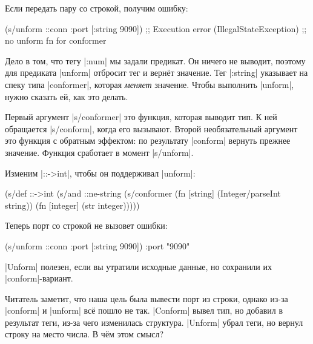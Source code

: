 \noindent
Если передать пару со строкой, получим ошибку:

\begin{english}
  \begin{clojure}
(s/unform ::conn {:port [:string 9090]})
;; Execution error (IllegalStateException)
;; no unform fn for conformer
  \end{clojure}
\end{english}

Дело в том, что тегу \spverb|:num| мы задали предикат. Он ничего не выводит,
поэтому для предиката \spverb|unform| отбросит тег и верн\"{е}т значение. Тег
\spverb|:string| указывает на спеку типа \spverb|conformer|, которая
\emph{меняет} значение. Чтобы выполнить \spverb|unform|, нужно сказать ей, как
это делать.


Первый аргумент \spverb|s/conformer| это функция, которая выводит тип. К ней
обращается \spverb|s/conform|, когда его вызывают. Второй необязательный
аргумент это функция с обратным эффектом: по результату \spverb|conform| вернуть
прежнее значение. Функция сработает в момент \spverb|s/unform|.

Изменим \spverb|::->int|, чтобы он поддерживал \spverb|unform|:

\begin{english}
  \begin{clojure}
(s/def ::->int
  (s/and
   ::ne-string
   (s/conformer
    (fn [string]
      (Integer/parseInt string))
    (fn [integer]
      (str integer)))))
  \end{clojure}
\end{english}

\noindent
Теперь порт со строкой не вызовет ошибки:

\begin{english}
  \begin{clojure}
(s/unform ::conn {:port [:string 9090]})
{:port "9090"}
  \end{clojure}
\end{english}

\spverb|Unform| полезен, если вы утратили исходные данные, но сохранили их
\spverb|conform|-вариант.

Читатель заметит, что наша цель была вывести порт из строки, однако из-за
\spverb|conform| и \spverb|unform| вс\"{е} пошло не так. \spverb|Conform| вывел тип,
но добавил в результат теги, из-за чего изменилась структура. \spverb|Unform|
убрал теги, но вернул строку на место числа. В ч\"{е}м этом смысл?

